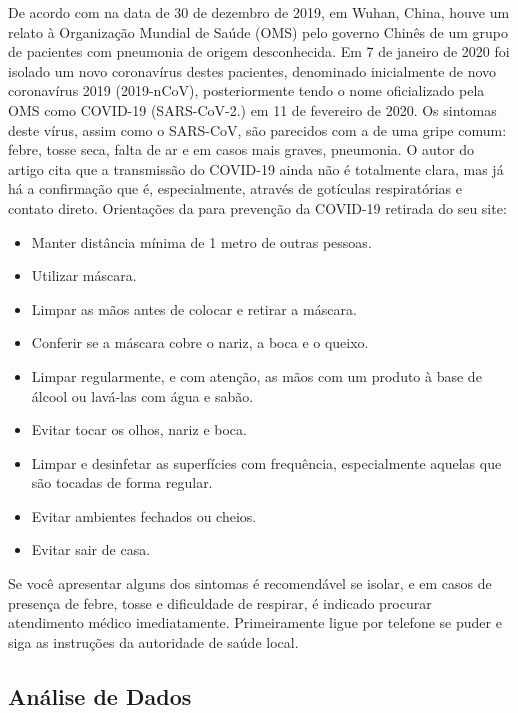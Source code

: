 \documentclass[
  fleqn,ebook]{ic}
\providecommand{\tightlist}{%
  \setlength{\itemsep}{0pt}\setlength{\parskip}{0pt}}
\begin{document}
De acordo com \cite{guarner2020three} na data de 30 de dezembro de 2019, em
Wuhan, China, houve um relato à Organização Mundial de Saúde (OMS) pelo governo
Chinês de um grupo de pacientes com pneumonia de origem desconhecida. Em 7 de
janeiro de 2020 foi isolado um novo coronavírus destes pacientes, denominado
inicialmente de novo coronavírus 2019 (2019-nCoV), posteriormente tendo o nome
oficializado pela OMS como COVID-19 (SARS-CoV-2.) em 11 de fevereiro de 2020. Os
sintomas deste vírus, assim como o SARS-CoV, são parecidos com a de uma gripe
comum: febre, tosse seca, falta de ar e em casos mais graves, pneumonia. O autor
do artigo \cite{qing2020possibility} cita que a transmissão do COVID-19 ainda
não é totalmente clara, mas já há a confirmação que é, especialmente, através de
gotículas respiratórias e contato direto. Orientações da \cite{covid19OMS} para
prevenção da COVID-19 retirada do seu site:

\begin{itemize}
\tightlist
\item
  Manter distância mínima de 1 metro de outras pessoas.
\item
  Utilizar máscara.
\item
  Limpar as mãos antes de colocar e retirar a máscara.
\item
  Conferir se a máscara cobre o nariz, a boca e o queixo.
\item
  Limpar regularmente, e com atenção, as mãos com um produto à base de álcool ou
  lavá-las com água e sabão.
\item
  Evitar tocar os olhos, nariz e boca.
\item
  Limpar e desinfetar as superfícies com frequência, especialmente aquelas que
  são tocadas de forma regular.
\item
  Evitar ambientes fechados ou cheios.
\item
  Evitar sair de casa.
\end{itemize}

Se você apresentar alguns dos sintomas é recomendável se isolar, e em casos de
presença de febre, tosse e dificuldade de respirar, é indicado procurar
atendimento médico imediatamente. Primeiramente ligue por telefone se puder e
siga as instruções da autoridade de saúde local.

\hypertarget{anuxe1lise-de-dados}{%
\subsection{Análise de Dados}\label{anuxe1lise-de-dados}}
\end{document}
